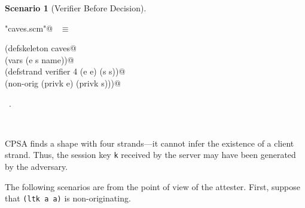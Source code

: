 \documentclass[titlepage,12pt]{article}
\theoremstyle{definition}
\newtheorem{scenario}{Scenario}
\begin{document}
\begin{scenario}[Verifier Before Decision]
\label{scene:verifier before decision}
\begin{flushleft} \small
\begin{minipage}{\linewidth} \label{scrap25}
\verb@"caves.scm"@\nobreak\ {\footnotesize {} }$\equiv$
\vspace{-1ex}
\begin{list}{}{} \item
\mbox{}\verb@(defskeleton caves@\\
\mbox{}\verb@  (vars (e s name))@\\
\mbox{}\verb@  (defstrand verifier 4 (e e) (s s))@\\
\mbox{}\verb@  (non-orig (privk e) (privk s)))@{\NWsep}
\end{list}
\vspace{-1ex}
\footnotesize\addtolength{\baselineskip}{-1ex}
\begin{list}{}{\setlength{\itemsep}{-\parsep}\setlength{\itemindent}{-\leftmargin}}
\item \NWtxtFileDefBy\ .
\end{list}
\end{minipage}\\[4ex]
\end{flushleft}
\end{scenario}

CPSA finds a shape with four strands---it cannot infer the existence
of a client strand. Thus, the session key \texttt{k} received
by the server may have been generated by the adversary.

The following scenarios are from the point of view of the
attester. First, suppose that \texttt{(ltk a a)} is
non-originating.
\end{document}
